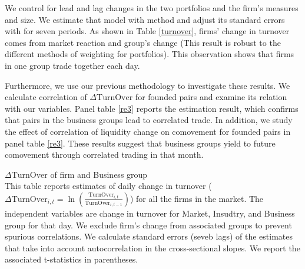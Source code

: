 		
	  We control for lead and lag changes in the two portfolios and the firm's measures and size. We estimate that model with \cite{FamaMacBeth} method and adjust its standard errors with \cite{newey1987hypothesis} for seven periods.  As shown in Table \ref{turnover}, firms' change in turnover comes from market reaction and group's change (This result is robust to the different methods of weighting for portfolios). This observation shows that firms in one group trade together each day. 
	
	Furthermore, we use our previous methodology to investigate these results. We calculate correlation of $ \Delta \text{TurnOver} $ for founded pairs and examine its relation with our variables. Panel  table \ref{re3} reports the estimation result, which confirms that pairs in the business groups lead to correlated trade. In addition, we study the effect of correlation of liquidity change on comovement for founded pairs in  panel  table \ref{re3}. These results suggest that business groups yield to future comovement through correlated trading in that month.
  
  
  
  
  
  
{\begin{table}[htbp]
	\centering
	\caption{$\Delta \text{TurnOver}$ of firm and Business group\\
	This table reports \cite{FamaMacBeth} estimates of daily change in turnover ($ \Delta \text{TurnOver}_{i,t} = \ln(\frac{\text{TurnOver}_{i,t}}{\text{TurnOver}_{i,t-1}}) $) for all the firms in the market. The independent variables are change in turnover for Market, Insudtry, and Business group for that day. We exclude firm's change from associated groups to prevent spurious correlations. We calculate \cite{newey1987hypothesis} standard errors (seveb lags) of the \cite{FamaMacBeth} estimates that take into account autocorrelation in the cross-sectional slopes. We report the associated t-statistics in parentheses. }
		\label{turnover}
	\resizebox{!}{!}{
		
	} 
\end{table}}

